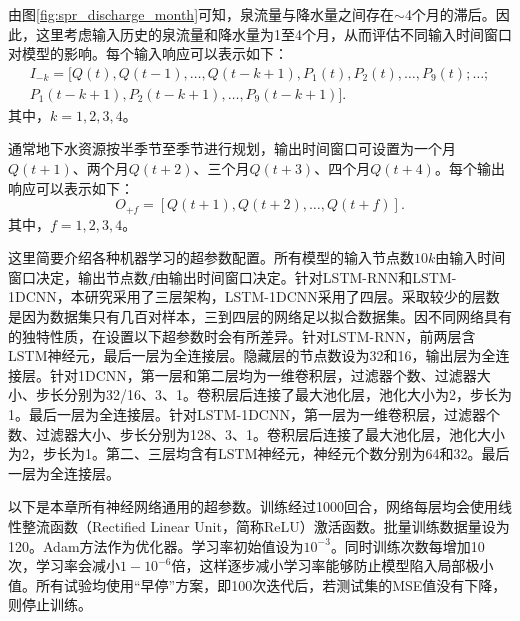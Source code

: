 由图\ref{fig:spr_discharge_month}可知，泉流量与降水量之间存在$\sim$4个月的滞后。因此，这里考虑输入历史的泉流量和降水量为1至4个月，从而评估不同输入时间窗口对模型的影响。每个输入响应可以表示如下：
\begin{equation}
  \label{eq:spr_input}
  \begin{split}
    I_{-k}=[Q(t),Q(t-1),\ldots,Q(t-k+1),P_1(t),P_2(t),\ldots,P_9(t);\ldots;\\
    P_1(t-k+1),P_2(t-k+1),\ldots,P_9(t-k+1)].
  \end{split}
\end{equation}
其中，$k=1,2,3,4$。

通常地下水资源按半季节至季节进行规划，输出时间窗口可设置为一个月$Q(t+1)$、两个月$Q(t+2)$、三个月$Q(t+3)$、四个月$Q(t+4)$。每个输出响应可以表示如下：
\begin{equation}
  \label{eq:spr_output}
  O_{+f}=[Q(t+1),Q(t+2),\ldots,Q(t+f)].
\end{equation}
其中，$f=1,2,3,4$。

这里简要介绍各种机器学习的超参数配置。所有模型的输入节点数$10k$由输入时间窗口决定，输出节点数$f$由输出时间窗口决定。针对LSTM-RNN和LSTM-1DCNN，本研究采用了三层架构，LSTM-1DCNN采用了四层。采取较少的层数是因为数据集只有几百对样本，三到四层的网络足以拟合数据集。因不同网络具有的独特性质，在设置以下超参数时会有所差异。针对LSTM-RNN，前两层含LSTM神经元，最后一层为全连接层。隐藏层的节点数设为32和16，输出层为全连接层。针对1DCNN，第一层和第二层均为一维卷积层，过滤器个数、过滤器大小、步长分别为32/16、3、1。卷积层后连接了最大池化层，池化大小为2，步长为1。最后一层为全连接层。针对LSTM-1DCNN，第一层为一维卷积层，过滤器个数、过滤器大小、步长分别为128、3、1。卷积层后连接了最大池化层，池化大小为2，步长为1。第二、三层均含有LSTM神经元，神经元个数分别为64和32。最后一层为全连接层。 

以下是本章所有神经网络通用的超参数。训练经过1000回合，网络每层均会使用线性整流函数（Rectified Linear Unit，简称ReLU）激活函数。批量训练数据量设为120。Adam方法作为优化器。学习率初始值设为$10^{-3}$。同时训练次数每增加10次，学习率会减小$1-10^{-6}$倍，这样逐步减小学习率能够防止模型陷入局部极小值。所有试验均使用“早停”方案，即100次迭代后，若测试集的MSE值没有下降，则停止训练。

